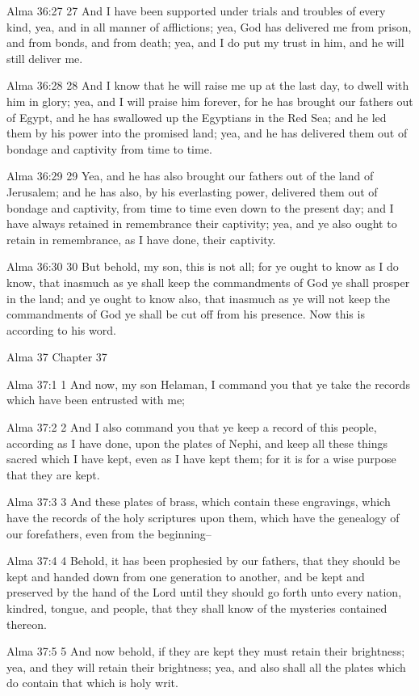 Alma 36:27
 27 And I have been supported under trials and troubles of every
kind, yea, and in all manner of afflictions; yea, God has
delivered me from prison, and from bonds, and from death; yea,
and I do put my trust in him, and he will still deliver me.

Alma 36:28
 28 And I know that he will raise me up at the last day, to dwell
with him in glory; yea, and I will praise him forever, for he has
brought our fathers out of Egypt, and he has swallowed up the
Egyptians in the Red Sea; and he led them by his power into the
promised land; yea, and he has delivered them out of bondage and
captivity from time to time.

Alma 36:29
 29 Yea, and he has also brought our fathers out of the land of
Jerusalem; and he has also, by his everlasting power, delivered
them out of bondage and captivity, from time to time even down to
the present day; and I have always retained in remembrance their
captivity; yea, and ye also ought to retain in remembrance, as I
have done, their captivity.

Alma 36:30
 30 But behold, my son, this is not all; for ye ought to know as
I do know, that inasmuch as ye shall keep the commandments of God
ye shall prosper in the land; and ye ought to know also, that
inasmuch as ye will not keep the commandments of God ye shall be
cut off from his presence. Now this is according to his word.

Alma 37
Chapter 37

Alma 37:1
 1 And now, my son Helaman, I command you that ye take the
records which have been entrusted with me;

Alma 37:2
 2 And I also command you that ye keep a record of this people,
according as I have done, upon the plates of Nephi, and keep all
these things sacred which I have kept, even as I have kept them;
for it is for a wise purpose that they are kept.

Alma 37:3
 3 And these plates of brass, which contain these engravings,
which have the records of the holy scriptures upon them, which
have the genealogy of our forefathers, even from the beginning--

Alma 37:4
 4 Behold, it has been prophesied by our fathers, that they
should be kept and handed down from one generation to another,
and be kept and preserved by the hand of the Lord until they
should go forth unto every nation, kindred, tongue, and people,
that they shall know of the mysteries contained thereon.

Alma 37:5
 5 And now behold, if they are kept they must retain their
brightness; yea, and they will retain their brightness; yea, and
also shall all the plates which do contain that which is holy
writ.

